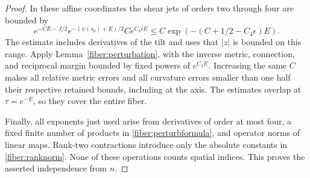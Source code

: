 \begin{proof}
In these affine coordinates the shear jets of orders two through four
are bounded by
\[
 e^{-CE-J/2}e^{-(\psi(s_0)+E)/2}Ce^{C_4\epsilon E}
 \le C\exp(-(C+1/2-C_4\epsilon)E).
\]
The estimate includes derivatives of the tilt and uses that \(|z|\) is
bounded on this range.  Apply Lemma~\ref{fiber:perturbation}, with the
inverse metric, connection, and reciprocal margin bounded by fixed
powers of \(e^{C_3E}\).  Increasing the same \(C\) makes all relative
metric errors and all curvature errors smaller than one half their
respective retained bounds, including at the axis.  The estimates
overlap at \(\tau=e^{-E}\), so they cover the entire fiber.

Finally, all exponents just used arise from derivatives of order at
most four, a fixed finite number of products in
\eqref{fiber:perturbformula}, and operator norms of linear maps.
Rank-two contractions introduce only the absolute constants in
\eqref{fiber:ranknorm}.  None of these operations counts spatial
indices.  This proves the asserted independence from \(n\).
\end{proof}
